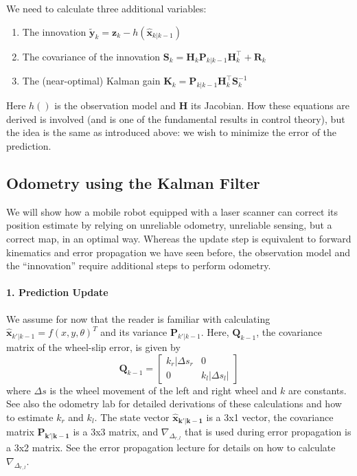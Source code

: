 We need to calculate three additional variables:
\begin{enumerate}
\item The innovation $ \tilde{\boldsymbol{y}}_{k}=\boldsymbol{z}_{k}-h(\hat{\boldsymbol{x}}_{k|k-1})$
\item The covariance of the innovation $\boldsymbol{S}_{k}={\boldsymbol{H}_{k}}\boldsymbol{P}_{k|k-1}{\boldsymbol{H}_{k}^\top}+\boldsymbol{R}_{k}$
\item The (near-optimal)  Kalman gain $ \boldsymbol{K}_{k}=\boldsymbol{P}_{k|k-1}{\boldsymbol{H}_{k}^\top}\boldsymbol{S}_{k}^{-1}$
\end{enumerate}
Here $ h()$ is the observation model and $ \boldsymbol{H}$ its Jacobian. How these equations are derived is involved (and is one of the fundamental results in control theory), but the idea is the same as introduced above: we wish to minimize the error of the prediction.

\subsection{Odometry using the Kalman Filter}
We will show how a mobile robot equipped with a laser scanner can correct its position estimate by relying on unreliable odometry, unreliable sensing, but a correct map, in an optimal way.
Whereas the update step is equivalent to forward kinematics and error propagation we have seen before, the observation model and the ``innovation'' require additional steps to perform odometry. 

\paragraph{1. Prediction Update}
We assume for now that the reader is familiar with calculating $ \hat{\boldsymbol{x}}_{k'|k-1}=f(x,y,\theta)^T$ and its variance $ \boldsymbol{P}_{k'|k-1}$. Here, $ \boldsymbol{Q}_{k-1}$, the covariance matrix of the wheel-slip error,  is given by
\begin{equation}
\boldsymbol{Q}_{k-1}=\left[\begin{array}{cc}k_r|\Delta s_r & 0\\0 & k_l|\Delta s_l|\end{array}\right]
\end{equation}
where $ \Delta s$ is the wheel movement of the left and right wheel and $ k$ are constants. See also the odometry lab for detailed derivations of these calculations and how to estimate $ k_r$ and $ k_l$.  The state vector $ \boldsymbol{\hat{x}_{k'|k-1}}$ is a 3x1 vector, the covariance matrix $ \boldsymbol{P_{k'|k-1}}$ is a 3x3 matrix, and $ \nabla_{\Delta_{r,l}}$ that is used during error propagation is a 3x2 matrix. See the error propagation lecture for details on how to calculate $ \nabla_{\Delta_{r,l}}$.

